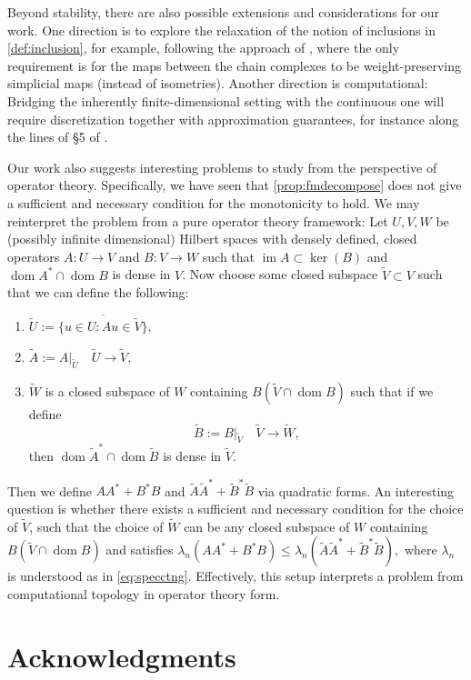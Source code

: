 \documentclass[11pt]{article}
\theoremstyle{definition}
\theoremstyle{remark}
\DeclareMathOperator\dom{dom}
\DeclareMathOperator{\im}{im}
\begin{document}
Beyond stability, there are also possible extensions and considerations for our work.  One direction is to explore the relaxation of the notion of inclusions in \cref{def:inclusion}, for example, following the approach of \citet{pl_simpmaps}, where the only requirement is for the maps between the chain complexes to be weight-preserving simplicial maps (instead of isometries).
Another direction is computational: Bridging the inherently finite-dimensional setting with the continuous one will require discretization together with approximation guarantees, for instance along the lines of \S5 of \citet{finderham}.

Our work also suggests interesting problems to study from the perspective of operator theory.  Specifically, we have seen that  \cref{prop:fmdecompose} does not give a sufficient and necessary condition for the monotonicity to hold. We may reinterpret the problem from a pure operator theory framework: Let $U,V,W$ be (possibly infinite dimensional) Hilbert spaces with densely defined, closed operators $A:U\to V$ and $B:V\to W$ such that $\im A\subset \ker (B)$ and $\dom A^*\cap \dom B$ is dense in $V$. Now choose some closed subspace $\tilde{V}\subset V$ such that we can define the following:
\begin{enumerate}
    \item[(i)] $\tilde{U}:=\overline{\{u\in U:Au\in \tilde{V}\}},$
    \item[(ii)] $\tilde{A}:=A|_{\tilde{U}}\quad \tilde{U}\to \tilde{V}$,
    \item[(iii)] $\tilde{W}$ is a closed subspace of $W$ containing $B(\tilde{V}\cap \dom B)$ such that if we define $$\tilde{B}:=B|_{\tilde{V}}\quad \tilde{V}\to \tilde{W},$$ then $\dom \tilde{A}^*\cap\dom \tilde{B}$ is dense in $\tilde{V}$.
\end{enumerate}
Then we define $AA^*+B^*B$ and $\tilde{A}\tilde{A}^*+\tilde{B}^*\tilde{B}$ via quadratic forms. An interesting question is whether there exists a sufficient and necessary condition for the choice of $\tilde{V}$, such that the choice of $\tilde{W}$ can be any closed subspace of $W$ containing $B(\tilde{V}\cap \dom B)$ and satisfies
$\lambda_n(AA^*+B^*B)\leq\lambda_n(\tilde{A}\tilde{A}^*+\tilde{B}^*\tilde{B}),$
where $\lambda_n$ is understood as in \eqref{eq:specctng}.  Effectively, this setup interprets a problem from computational topology in operator theory form. 


\section*{Acknowledgments}
\end{document}
